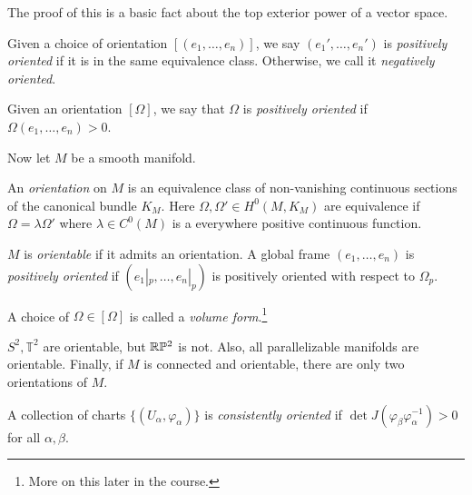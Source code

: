 \documentclass[twoside, 10pt]{article}
\begin{document}
    The proof of this is a basic fact about the top exterior power of a vector
    space.

    \begin{defn} Given a choice of orientation $[(e_1, \ldots, e_n)]$, we say
    $(e_1', \ldots, e_n')$ is \textit{positively oriented} if it is in the same
equivalence class. Otherwise, we call it \textit{negatively oriented}.
\end{defn}

    \begin{defn} Given an orientation $[\Omega]$, we say that $\Omega$ is
    \textit{positively oriented} if $\Omega(e_1, \ldots, e_n) > 0$.  \end{defn}

    Now let $M$ be a smooth manifold.

    \begin{defn} An \textit{orientation} on $M$ is an equivalence class of
        non-vanishing continuous sections of the canonical bundle $K_M$. Here
        $\Omega, \Omega' \in H^0(M, K_M)$ are equivalence if $\Omega = \lambda
        \Omega'$ where $\lambda \in C^0(M)$ is a everywhere positive continuous
        function.  \end{defn}

    \begin{defn} $M$ is \textit{orientable} if it admits an orientation. A
    global frame $(e_1, \ldots, e_n)$ is \textit{positively oriented} if
$(e_1|_p, \ldots, e_n|_p)$ is positively oriented with respect to $\Omega_p$.
\end{defn}

    \begin{defn} A choice of $\Omega \in [\Omega]$ is called a \textit{volume
    form}.\footnote{More on this later in the course.} \end{defn}

    \begin{rmk} $S^2, \mathbb{T}^2$ are orientable, but $\mathbb{R}\mathbb{P}^2$ is not. Also,
    all parallelizable manifolds are orientable. Finally, if $M$ is connected
and orientable, there are only two orientations of $M$.  \end{rmk}

    \begin{defn} A collection of charts $\{(U_{\alpha}, \varphi_{\alpha})\}$ is
    \textit{consistently oriented} if $\det J(\varphi_{\beta}
\varphi_{\alpha}^{-1}) > 0$ for all $\alpha,\beta$.  \end{defn}
\end{document}
